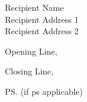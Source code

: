 \documentclass[9pt]{letter}
\date{Todays Date}
\begin{document}
\begin{letter}{%
	Recipient Name \\ 
	Recipient Address 1 \\ 
	Recipient Address 2}
	
\opening{Opening Line,}

\lipsum

\lipsum

\closing{Closing Line,}

\ps{(if ps applicable)}

\end{letter}
\end{document}
